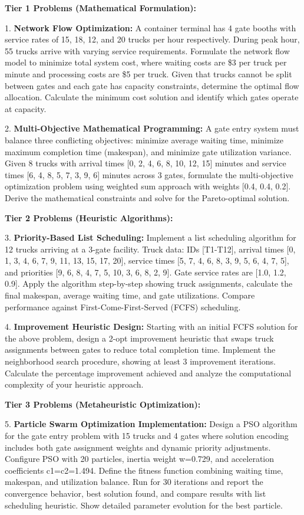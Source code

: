 \documentclass{article}
\begin{document}
\textbf{Tier 1 Problems (Mathematical Formulation):}

1. \textbf{Network Flow Optimization:} A container terminal has 4 gate booths with service rates of 15, 18, 12, and 20 trucks per hour respectively. During peak hour, 55 trucks arrive with varying service requirements. Formulate the network flow model to minimize total system cost, where waiting costs are \$3 per truck per minute and processing costs are \$5 per truck. Given that trucks cannot be split between gates and each gate has capacity constraints, determine the optimal flow allocation. Calculate the minimum cost solution and identify which gates operate at capacity.

2. \textbf{Multi-Objective Mathematical Programming:} A gate entry system must balance three conflicting objectives: minimize average waiting time, minimize maximum completion time (makespan), and minimize gate utilization variance. Given 8 trucks with arrival times [0, 2, 4, 6, 8, 10, 12, 15] minutes and service times [6, 4, 8, 5, 7, 3, 9, 6] minutes across 3 gates, formulate the multi-objective optimization problem using weighted sum approach with weights [0.4, 0.4, 0.2]. Derive the mathematical constraints and solve for the Pareto-optimal solution.

\textbf{Tier 2 Problems (Heuristic Algorithms):}

3. \textbf{Priority-Based List Scheduling:} Implement a list scheduling algorithm for 12 trucks arriving at a 3-gate facility. Truck data: IDs [T1-T12], arrival times [0, 1, 3, 4, 6, 7, 9, 11, 13, 15, 17, 20], service times [5, 7, 4, 6, 8, 3, 9, 5, 6, 4, 7, 5], and priorities [9, 6, 8, 4, 7, 5, 10, 3, 6, 8, 2, 9]. Gate service rates are [1.0, 1.2, 0.9]. Apply the algorithm step-by-step showing truck assignments, calculate the final makespan, average waiting time, and gate utilizations. Compare performance against First-Come-First-Served (FCFS) scheduling.

4. \textbf{Improvement Heuristic Design:} Starting with an initial FCFS solution for the above problem, design a 2-opt improvement heuristic that swaps truck assignments between gates to reduce total completion time. Implement the neighborhood search procedure, showing at least 3 improvement iterations. Calculate the percentage improvement achieved and analyze the computational complexity of your heuristic approach.

\textbf{Tier 3 Problems (Metaheuristic Optimization):}

5. \textbf{Particle Swarm Optimization Implementation:} Design a PSO algorithm for the gate entry problem with 15 trucks and 4 gates where solution encoding includes both gate assignment weights and dynamic priority adjustments. Configure PSO with 20 particles, inertia weight w=0.729, and acceleration coefficients c1=c2=1.494. Define the fitness function combining waiting time, makespan, and utilization balance. Run for 30 iterations and report the convergence behavior, best solution found, and compare results with list scheduling heuristic. Show detailed parameter evolution for the best particle.
\end{document}
